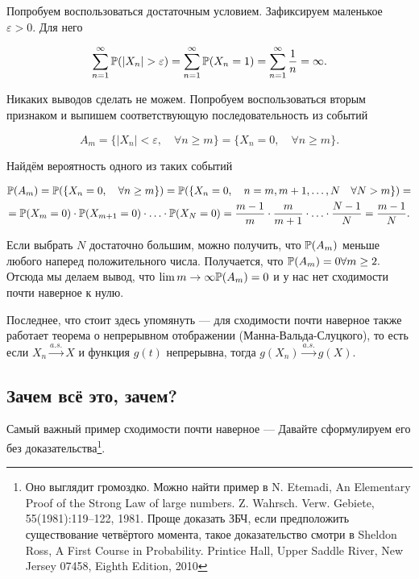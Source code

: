 \documentclass[12pt, a4paper, oneside]{article}
\begin{document}
\begin{sol} 
Попробуем воспользоваться достаточным условием. Зафиксируем маленькое $\varepsilon > 0.$ Для него 

\[
\sum_{n=1}^{\infty} \mathbb{P}(|X_n| > \varepsilon) = \sum_{n=1}^{\infty} \mathbb{P}(X_n = 1) = \sum_{n=1}^{\infty} \frac{1}{n} = \infty.
\]

Никаких выводов сделать не можем. Попробуем воспользоваться вторым признаком и выпишем соответствующую последовательность из событий 

\[
A_m = \{|X_n| < \varepsilon, \quad \forall n \ge m\} = \{X_n = 0, \quad \forall n \ge m\}.
\]

Найдём вероятность одного из таких событий 

\begin{multline*} 
\mathbb{P}(A_m) = \mathbb{P}(\{X_n = 0, \quad \forall n \ge m\}) = \mathbb{P}(\{X_n = 0, \quad n = m, m+1, \ldots, N \quad \forall N > m \}) = \\ = \mathbb{P}(X_m = 0) \cdot \mathbb{P}(X_{m + 1} = 0) \cdot \ldots \cdot \mathbb{P}(X_N  = 0) = \frac{m - 1}{m} \cdot \frac{m}{m + 1} \cdot \ldots \cdot \frac{N - 1}{N} = \frac{m - 1}{N}.
\end{multline*}

Если выбрать $N$ достаточно большим, можно получить, что $\mathbb{P}(A_m)$ меньше любого наперед положительного числа. Получается, что $\mathbb{P}(A_m) = 0 \forall m \ge 2.$ Отсюда мы делаем вывод, что $\lim{m \to \infty} \mathbb{P}(A_m) = 0$ и у нас нет сходимости почти наверное к нулю. 
\end{sol} 

Последнее, что стоит здесь упомянуть --- для сходимости почти наверное также работает теорема о непрерывном отображении (Манна-Вальда-Слуцкого), то есть если $X_n \overset{a.s.}{\to} X$ и функция $g(t)$ непрерывна, тогда $g(X_n) \overset{a.s.}{\to} g(X).$

\subsection{Зачем всё это, зачем?}

Самый важный пример сходимости почти наверное ---  Давайте сформулируем его без доказательства\footnote{Оно выглядит громоздко. Можно найти пример в N. Etemadi, An Elementary Proof of the Strong Law of large numbers. Z. Wahrsch. Verw. Gebiete, 55(1981):119--122, 1981. \newline Проще доказать ЗБЧ, если предположить существование четвёртого момента, такое доказательство смотри в Sheldon Ross, A First Course in Probability. Printice Hall, Upper Saddle River, New Jersey 07458, Eighth Edition, 2010}. 
\end{document}
